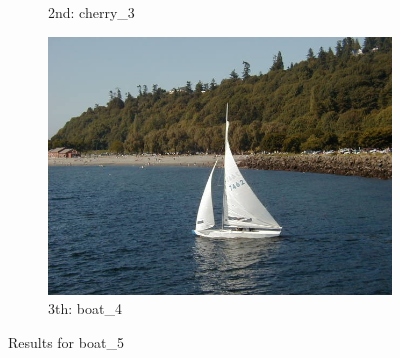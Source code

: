 \begin{itemize}
\begin{figure}[H]
\begin{subfigure}{0.25\textwidth}
        \caption{2nd: cherry\_3}
    \end{subfigure}%
    \begin{subfigure}{0.25\textwidth}
	  \centering
	  \includegraphics[width=0.9\linewidth]{../input/boat_4.jpg}
	    \caption{3th: boat\_4}
	\end{subfigure}
    \caption{Results for boat\_5}
    \label{fig:results_boat_5}
\end{figure}


\end{itemize}
